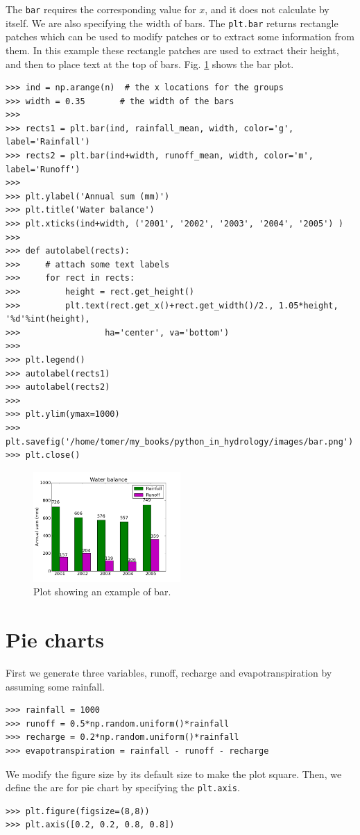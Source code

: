 \documentclass[10pt]{book}
\begin{document}
{The \verb"bar" requires the corresponding value for $x$, and it does not calculate by itself. We are also specifying the width of bars. The 
\verb"plt.bar" returns rectangle patches which can be used to modify  patches or to extract some information from them. In this example these rectangle patches are used to extract their height, and then to place text at the top of bars. Fig. \ref{fig:bar} shows the bar plot. 
\beforeverb \begin{verbatim}
>>> ind = np.arange(n)  # the x locations for the groups
>>> width = 0.35       # the width of the bars
>>> 
>>> rects1 = plt.bar(ind, rainfall_mean, width, color='g', label='Rainfall')
>>> rects2 = plt.bar(ind+width, runoff_mean, width, color='m', label='Runoff')
>>> 
>>> plt.ylabel('Annual sum (mm)')
>>> plt.title('Water balance')
>>> plt.xticks(ind+width, ('2001', '2002', '2003', '2004', '2005') )
>>> 
>>> def autolabel(rects):
>>>     # attach some text labels
>>>     for rect in rects:
>>>         height = rect.get_height()
>>>         plt.text(rect.get_x()+rect.get_width()/2., 1.05*height, '%d'%int(height),
>>>                 ha='center', va='bottom')
>>> 
>>> plt.legend()
>>> autolabel(rects1)
>>> autolabel(rects2)
>>> 
>>> plt.ylim(ymax=1000)
>>> plt.savefig('/home/tomer/my_books/python_in_hydrology/images/bar.png')
>>> plt.close()
\end{verbatim} \afterverb

\beforefig
\begin{figure}[h!]
  \centering
    \includegraphics[width=0.5\textwidth]{images/bar.png}
  \caption{Plot showing an example of bar.}
   \label{fig:bar}
\end{figure}
\afterfig

\section{Pie charts}
First we generate three variables, runoff, recharge and evapotranspiration by assuming some rainfall. 
\beforeverb \begin{verbatim}
>>> rainfall = 1000
>>> runoff = 0.5*np.random.uniform()*rainfall
>>> recharge = 0.2*np.random.uniform()*rainfall
>>> evapotranspiration = rainfall - runoff - recharge
\end{verbatim} \afterverb
We modify the figure size by its default size to make the plot square. Then, we define the are for pie chart by specifying the \verb"plt.axis". 
\beforeverb \begin{verbatim}
>>> plt.figure(figsize=(8,8))
>>> plt.axis([0.2, 0.2, 0.8, 0.8])
\end{verbatim} \afterverb

}
\end{document}
